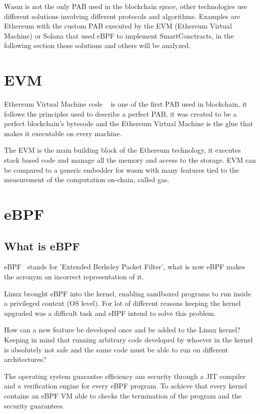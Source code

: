 Wasm is not the only PAB used in the blockchain space, other technologies use different solutions involving different protocols and algorithms. Examples are Ethereum with the custom PAB executed by the EVM (Ethereum Virtual Machine) or Solana that used eBPF to implement SmartConctracts, in the following section those solutions and others will be analyzed.

\section{EVM}

Ethereum Virtual Machine code ~\cite{buterin2014next} is one of the first PAB used in blockchain, it follows the principles used to describe a perfect PAB, it was created to be a perfect blockchain's bytecode and the Ethereum Virtual Machine is the glue that makes it executable on every machine.

The EVM is the main building block of the Ethereum technology, it executes stack based code and manage all the memory and access to the storage. EVM can be compared to a generic embedder for wasm with many features tied to the measurement of the computation on-chain, called gas.

\section{eBPF}

\subsection{What is eBPF}

eBPF~\cite{ebpf} stands for 'Extended Berkeley Packet Filter', what is now eBPF makes the acronym an incorrect representation of it.

Linux brought eBPF into the kernel, enabling sandboxed programs to run inside a privileged context (OS level). For lot of different reasons keeping the kernel upgraded was a difficult task and eBPF intend to solve this problem.

How can a new feature be developed once and be added to the Linux kernel? Keeping in mind that running arbitrary code developed by whoever in the kernel is absolutely not safe and the same code must be able to run on different architectures?

The operating system guarantee efficiency ans security through a JIT compiler and a verification engine for every eBPF program. To achieve that every kernel contains an eBPF VM able to checks the termination of the program and the security guarantees.

